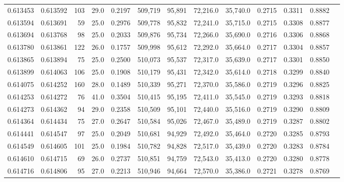 \begin{tabular}{rrrrrrrrrrrrr}
0.613453 & 0.613592 &   103 & 29.0 &                                     0.2197 & 509,719 &  95,891 &  72,216.0 &  35,740.0 & 0.2715 & 0.3311 & 0.8882 \\
0.613594 & 0.613691 &    59 & 25.0 &                                     0.2976 & 509,778 &  95,832 &  72,241.0 &  35,715.0 & 0.2715 & 0.3308 & 0.8877 \\
0.613694 & 0.613768 &    98 & 25.0 &                                     0.2033 & 509,876 &  95,734 &  72,266.0 &  35,690.0 & 0.2716 & 0.3306 & 0.8868 \\
0.613780 & 0.613861 &   122 & 26.0 &                                     0.1757 & 509,998 &  95,612 &  72,292.0 &  35,664.0 & 0.2717 & 0.3304 & 0.8857 \\
0.613865 & 0.613894 &    75 & 25.0 &                                     0.2500 & 510,073 &  95,537 &  72,317.0 &  35,639.0 & 0.2717 & 0.3301 & 0.8850 \\
0.613899 & 0.614063 &   106 & 25.0 &                                     0.1908 & 510,179 &  95,431 &  72,342.0 &  35,614.0 & 0.2718 & 0.3299 & 0.8840 \\
0.614075 & 0.614252 &   160 & 28.0 &                                     0.1489 & 510,339 &  95,271 &  72,370.0 &  35,586.0 & 0.2719 & 0.3296 & 0.8825 \\
0.614253 & 0.614272 &    76 & 41.0 &                                     0.3504 & 510,415 &  95,195 &  72,411.0 &  35,545.0 & 0.2719 & 0.3293 & 0.8818 \\
0.614273 & 0.614362 &    94 & 29.0 &                                     0.2358 & 510,509 &  95,101 &  72,440.0 &  35,516.0 & 0.2719 & 0.3290 & 0.8809 \\
0.614364 & 0.614434 &    75 & 27.0 &                                     0.2647 & 510,584 &  95,026 &  72,467.0 &  35,489.0 & 0.2719 & 0.3287 & 0.8802 \\
0.614441 & 0.614547 &    97 & 25.0 &                                     0.2049 & 510,681 &  94,929 &  72,492.0 &  35,464.0 & 0.2720 & 0.3285 & 0.8793 \\
0.614549 & 0.614605 &   101 & 25.0 &                                     0.1984 & 510,782 &  94,828 &  72,517.0 &  35,439.0 & 0.2720 & 0.3283 & 0.8784 \\
0.614610 & 0.614715 &    69 & 26.0 &                                     0.2737 & 510,851 &  94,759 &  72,543.0 &  35,413.0 & 0.2720 & 0.3280 & 0.8778 \\
0.614716 & 0.614806 &    95 & 27.0 &                                     0.2213 & 510,946 &  94,664 &  72,570.0 &  35,386.0 & 0.2721 & 0.3278 & 0.8769 \\

\end{tabular}
